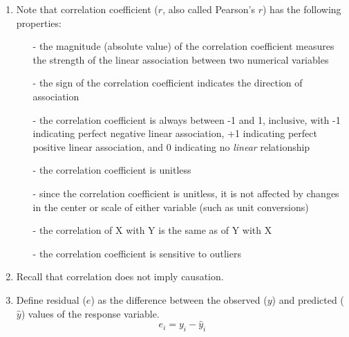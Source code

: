 \documentclass[11pt]{article}
\begin{document}
\begin{enumerate}
\item Note that correlation coefficient ($r$, also called Pearson's $r$) has the following properties:
\begin{enumerate}
\item[-] the magnitude (absolute value) of the correlation coefficient measures the strength of the linear association between two numerical variables
\item[-] the sign of the correlation coefficient indicates the direction of association
\item[-] the correlation coefficient is always between -1 and 1, inclusive, with -1 indicating perfect negative linear association, +1 indicating perfect positive linear association, and 0 indicating no \emph{linear} relationship
\item[-] the correlation coefficient is unitless
\item[-] since the correlation coefficient is unitless, it is not affected by changes in the center or scale of either variable (such as unit conversions)
\item[-] the correlation of X with Y is the same as of Y with X 
\item[-] the correlation coefficient is sensitive to outliers
\end{enumerate}

\item Recall that correlation does not imply causation.

\item Define residual ($e$) as the difference between the observed ($y$) and predicted ($\hat{y}$) values of the response variable.
\[ e_i = y_i - \hat{y}_i \]

\end{enumerate}
\end{document}
